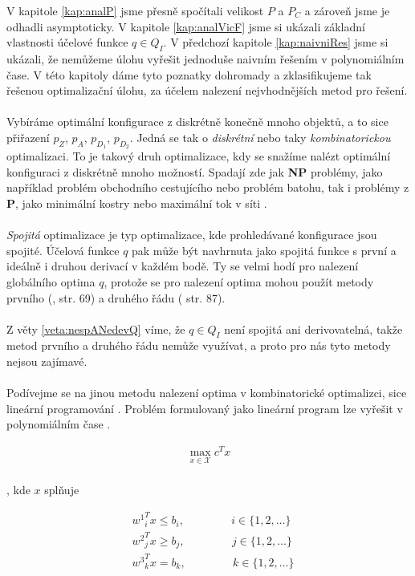 V kapitole \ref{kap:analP} jsme přesně spočítali velikost $P$ a $P_C$ a zároveň jsme je odhadli asymptoticky.
V kapitole \ref{kap:analVicF} jsme si ukázali základní vlastnosti účelové funkce $q \in Q_I$.
V předchozí kapitole \ref{kap:naivniRes} jsme si ukázali, že nemůžeme úlohu vyřešit jednoduše naivním řešením v polynomiálním čase.
V této kapitoly dáme tyto poznatky dohromady a zklasifikujeme tak řešenou optimalizační úlohu, za účelem nalezení nejvhodnějších metod pro řešení.
\\
\\
Vybíráme optimální konfigurace z diskrétně konečně mnoho objektů, a to sice přiřazení $p_Z$, $p_A$, $p_{D_{1}}$, $p_{D_{2}}$.
Jedná se tak o \textit{diskrétní} nebo taky \textit{kombinatorickou} optimalizaci.
To je takový druh optimalizace, kdy se snažíme nalézt optimální konfiguraci z diskrétně mnoho možností.
Spadají zde jak \textbf{NP} problémy, jako například problém obchodního cestujícího nebo problém batohu, tak i problémy z \textbf{P}, jako minimální kostry nebo maximální tok v síti \cite{CO}.
\\
\\
\textit{Spojitá} optimalizace je typ optimalizace, kde prohledávané konfigurace jsou spojité.
Účelová funkce $q$ pak může být navhrnuta jako spojitá funkce s první a ideálně i druhou derivací v každém bodě.
Ty se velmi hodí pro nalezení globálního optima $q$, protože se pro nalezení optima mohou použít metody prvního (\citet{AlgOptBook}, str. 69) a druhého řádu (\citet{AlgOptBook} str. 87).
\\
\\
Z věty \ref{veta:nespANedevQ} víme, že $q \in Q_I$ není spojitá ani derivovatelná, takže metod prvního a druhého řádu nemůže využívat, a proto pro nás tyto metody nejsou zajímavé.
\\
\\
Podívejme se na jinou metodu nalezení optima v kombinatorické optimalizci, sice lineární programování \cite{LP}.
Problém formulovaný jako lineární program lze vyřešit v polynomiálním čase \citet{cohen2020solving}.

\begin{definice}
  \begin{align*}
    \max_{x \in \mathcal{X}} c^T x
  \end{align*}
  \\
  , kde $x$ splňuje

  \begin{align*}
    &{w^1}^T_i x \leq b_i, \hspace{50pt} i \in \{ 1, 2, \dots \} \\
    &{w^2}^T_j x \geq b_j, \hspace{50pt} j \in \{ 1, 2, \dots \} \\
    &{w^3}^T_k x = b_k,    \hspace{50pt} k \in \{ 1, 2, \dots \}
  \end{align*}
  \\
\end{definice}

